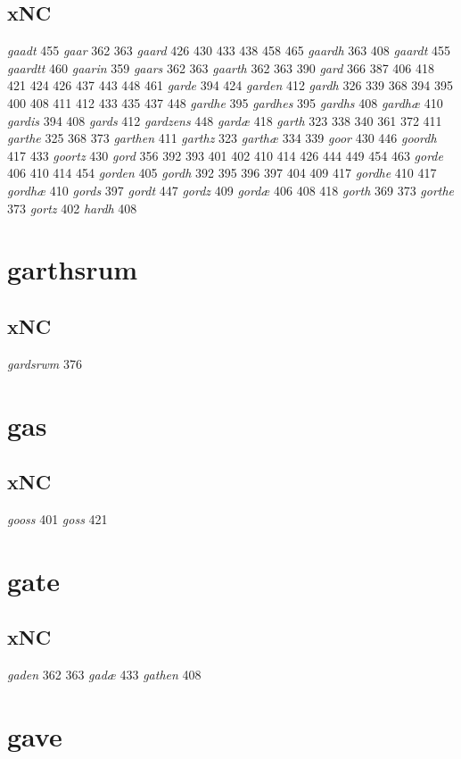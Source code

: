 \documentclass[a4paper,twocolumn]{article}
\begin{document}
\subsection{xNC}
\label{sec:org5cf9e57}
\emph{gaadt} 455 \emph{gaar} 362 363 \emph{gaard} 426 430 433 438 458 465 \emph{gaardh} 363 408 \emph{gaardt} 455 \emph{gaardtt} 460 \emph{gaarin} 359 \emph{gaars} 362 363 \emph{gaarth} 362 363 390 \emph{gard} 366 387 406 418 421 424 426 437 443 448 461 \emph{garde} 394 424 \emph{garden} 412 \emph{gardh} 326 339 368 394 395 400 408 411 412 433 435 437 448 \emph{gardhe} 395 \emph{gardhes} 395 \emph{gardhs} 408 \emph{gardhæ} 410 \emph{gardis} 394 408 \emph{gards} 412 \emph{gardzens} 448 \emph{gardæ} 418 \emph{garth} 323 338 340 361 372 411 \emph{garthe} 325 368 373 \emph{garthen} 411 \emph{garthz} 323 \emph{garthæ} 334 339 \emph{goor} 430 446 \emph{goordh} 417 433 \emph{goortz} 430 \emph{gord} 356 392 393 401 402 410 414 426 444 449 454 463 \emph{gorde} 406 410 414 454 \emph{gorden} 405 \emph{gordh} 392 395 396 397 404 409 417 \emph{gordhe} 410 417 \emph{gordhæ} 410 \emph{gords} 397 \emph{gordt} 447 \emph{gordz} 409 \emph{gordæ} 406 408 418 \emph{gorth} 369 373 \emph{gorthe} 373 \emph{gortz} 402 \emph{hardh} 408 
\section{garthsrum}
\label{sec:org327e3c0}
\subsection{xNC}
\label{sec:org6c82728}
\emph{gardsrwm} 376 
\section{gas}
\label{sec:org1514e5c}
\subsection{xNC}
\label{sec:org6c86b4f}
\emph{gooss} 401 \emph{goss} 421 
\section{gate}
\label{sec:org30c7417}
\subsection{xNC}
\label{sec:org4b6ec01}
\emph{gaden} 362 363 \emph{gadæ} 433 \emph{gathen} 408 
\section{gave}
\label{sec:org14b4894}
\end{document}
